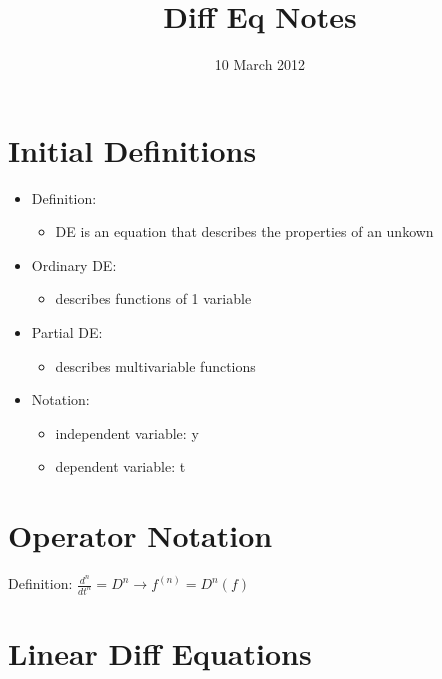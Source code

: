 \documentclass[11pt]{article}
\title{Diff Eq Notes}
\author{}
\date{10 March 2012}
\begin{document}
\maketitle

\setcounter{tocdepth}{3}
\tableofcontents
\vspace*{1cm}

\section{Initial Definitions}
\label{sec-1}

\begin{itemize}
\item Definition:

\begin{itemize}
\item DE is an equation that describes the properties of an unkown
\end{itemize}

\item Ordinary DE:

\begin{itemize}
\item describes functions of 1 variable
\end{itemize}

\item Partial DE:

\begin{itemize}
\item describes multivariable functions
\end{itemize}

\item Notation:

\begin{itemize}
\item independent variable: y
\item dependent variable: t
\end{itemize}

\end{itemize}
\section{Operator Notation}
\label{sec-2}

  Definition:
  $\frac{d^n}{dt^n} = D^n \rightarrow f^{(n)} = D^n(f)$
\section{Linear Diff Equations}
\label{sec-3}
\end{document}
